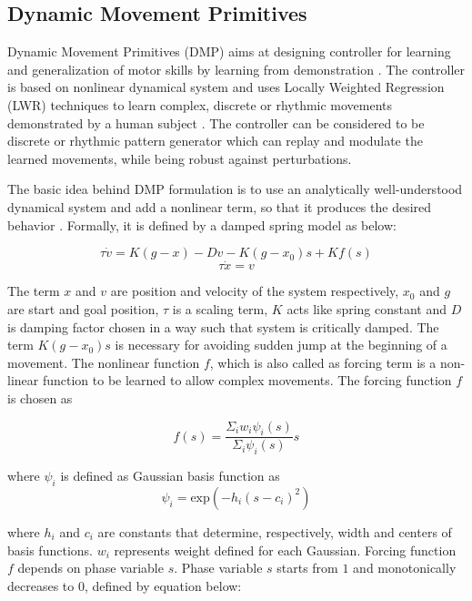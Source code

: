 \documentclass[sigconf]{acmart}
\begin{document}
\subsection{Dynamic Movement Primitives}
\label{sec:dmp}
Dynamic Movement Primitives (DMP) aims at designing controller for learning and generalization of motor skills by learning from demonstration \cite{ijspeert2003learning}. The controller is based on nonlinear dynamical system and uses Locally Weighted Regression (LWR) techniques to learn complex, discrete or rhythmic movements demonstrated by a human subject \cite{ijspeert2002movement}. The controller can be considered to be discrete or rhythmic pattern generator which can replay and modulate the learned movements, while being robust against perturbations.

The basic idea behind DMP formulation is to use an analytically well-understood dynamical system and add a nonlinear term, so that it produces the desired behavior \cite{ijspeert2013dynamical}. Formally, it is defined by a damped spring model as below:

\begin{equation}
	\tau	 \dot{v} = K (g - x) -D v - K (g - x_0) s + K f(s)
\end{equation}
\begin{equation}
	\tau	 \dot{x} = v
\end{equation}

The term $x$ and $v$ are position and velocity of the system respectively, $x_0$ and $g$ are start and goal position, $\tau$ is a scaling term, $K$ acts like spring constant and $D$ is damping factor chosen in a way such that system is critically damped. The term $K (g - x_0) s$ is necessary for avoiding sudden jump at the beginning of a movement. The nonlinear function $f$, which is also called as forcing term is a non-linear function to be learned to allow complex movements. The forcing function $f$ is chosen as

\begin{equation}
	f(s) = \frac{\Sigma_{i} w_i \psi_i(s)}{\Sigma_{i} \psi_i(s)} s
	\label{eq:forcing_func}
\end{equation}

where $\psi_i$ is defined as Gaussian basis function as
\begin{equation}
	\psi_i = \textrm{exp}\left( -h_i \left( s - c_i\right)^2 \right)
\end{equation}

where $h_i$ and $c_i$ are constants that determine, respectively, width and centers of basis functions. $w_i$ represents weight defined for each Gaussian. Forcing function $f$ depends on phase variable $s$. Phase variable $s$ starts from $1$ and monotonically decreases to $0$, defined by equation below:
\end{document}
